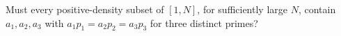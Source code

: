 Must every positive-density subset of $[1,N]$, for sufficiently large $N$, contain $a_1,a_2,a_3$ with $a_1p_1=a_2p_2=a_3p_3$ for three distinct primes?
